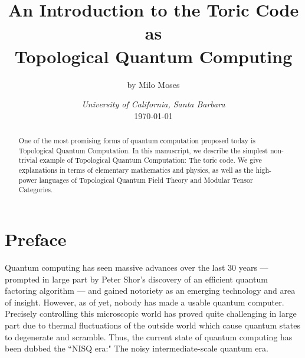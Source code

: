 \documentclass{article}
\title{An Introduction to the Toric Code as \\ Topological Quantum Computing}
\author{by Milo Moses}
\date{\textit{University of California, Santa Barbara} \\ [2ex] \today}
\theoremstyle{definition}
\numberwithin{figure}{section}
\begin{document}
\maketitle

\newcommand{\RR}{\mathbb{R}}
\newcommand{\HH}{\mathbb{H}}
\newcommand{\NN}{\mathbb{N}}
\newcommand{\QQ}{\mathbb{Q}}
\newcommand{\CC}{\mathbb{C}}
\newcommand{\FF}{\mathbb{F}}
\newcommand{\ZZ}{\mathbb{Z}}
\newcommand{\Ncal}{\mathcal{N}}
\newcommand{\TT}{\mathcal{T}}
\newcommand{\st}{\,\,\mathrm{s.t}\,\,}
\newcommand{\mm}{\mathfrak{m}}
\newcommand{\pp}{\mathfrak{p}}
\newcommand{\Hom}{\mathrm{Hom}}
\newcommand{\Frac}{\mathrm{Frac}}
\newcommand{\res}{\mathrm{res}}
\newcommand{\Vecc}{\mathrm{Vec}}
\newcommand{\0}{\left|0\right>}
\newcommand{\1}{\left|1\right>}
\newcommand{\nullclass}{\left|\bold{0}\right>}
\newcommand{\alphaclass}{\left|\alpha\right>}
\newcommand{\betaclass}{\left|\beta\right>}
\newcommand{\alphabetaclass}{\left|\alpha\beta\right>}
\newcommand{\ppsi}{\left|\psi\right>}
\newcommand{\bigleadsto}{\mathlarger{\mathlarger{\mathlarger{\leadsto}}}}


\begin{abstract}
One of the most promising forms of quantum computation proposed today is Topological Quantum Computation. In this manuscript, we describe the simplest non-trivial example of Topological Quantum Computation: The toric code. We give explanations in terms of elementary mathematics and physics, as well as the high-power languages of Topological Quantum Field Theory and Modular Tensor Categories.
\end{abstract}

\newpage

\section{Preface}
\label{Preface}

Quantum computing has seen massive advances over the last 30 years — prompted in large part by Peter Shor's discovery of an efficient quantum factoring algorithm \cite{shor1994algorithms} — and gained notoriety as an emerging technology and area of insight. However, as of yet, nobody has made a usable quantum computer. Precisely controlling this microscopic world has proved quite challenging in large part due to thermal fluctuations of the outside world which cause quantum states to degenerate and scramble. Thus, the current state of quantum computing has been dubbed the ``NISQ era:" The noisy intermediate-scale quantum era.
\end{document}
